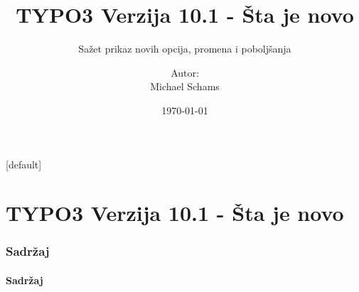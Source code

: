 \documentclass[t]{beamer}
\title{TYPO3 Verzija 10.1 - Šta je novo}
\subtitle{Sažet prikaz novih opcija, promena i poboljšanja}
\author{
	\centerline{Autor:}
	\centerline{Michael Schams}
}
\date{\today}
\begin{document}
\sharefont


\begingroup
	[default]
	\begin{frame}
		\titlepage
	\end{frame}
\endgroup


\section*{TYPO3 Verzija 10.1 - Šta je novo}
\begin{frame}[fragile]
	\frametitle{Sadržaj}
	\framesubtitle{Sadržaj}

	\tableofcontents

\end{frame}











%

\end{document}
